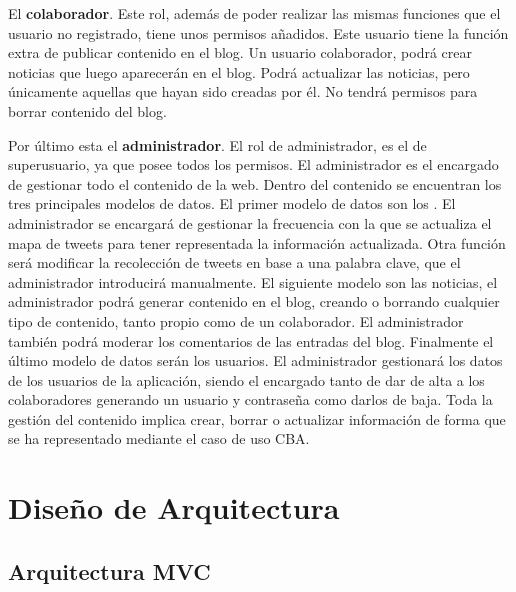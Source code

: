 El \textbf{colaborador}. Este rol, además de poder realizar las mismas funciones que el usuario no registrado, tiene unos permisos añadidos. Este usuario tiene la función extra de publicar contenido en el blog. Un usuario colaborador, podrá crear noticias que luego aparecerán en el blog. Podrá actualizar las noticias, pero únicamente aquellas que hayan sido creadas por él. No tendrá permisos para borrar contenido del blog.

\vspace{5 mm}

Por último esta el \textbf{administrador}. El rol de administrador, es el de superusuario, ya que posee todos los permisos. El administrador es el encargado de gestionar todo el contenido de la web. Dentro del contenido se encuentran los tres principales modelos de datos. El primer modelo de datos son los . El administrador se encargará de gestionar la frecuencia con la que se actualiza el mapa de tweets para tener representada la información actualizada. Otra función será modificar la recolección de tweets en base a una palabra clave, que el administrador introducirá manualmente. El siguiente modelo son las noticias, el administrador podrá generar contenido en el blog, creando o borrando cualquier tipo de contenido, tanto propio como de un colaborador. El administrador también podrá moderar los comentarios de las entradas del blog. Finalmente el último modelo de datos serán los usuarios. El administrador gestionará los datos de los usuarios de la aplicación, siendo el encargado tanto de dar de alta a los colaboradores generando un usuario y contraseña como darlos de baja. Toda la gestión del contenido implica crear, borrar o actualizar información de forma que se ha representado mediante el caso de uso CBA.


\section{Diseño de Arquitectura}

\subsection{Arquitectura MVC}

